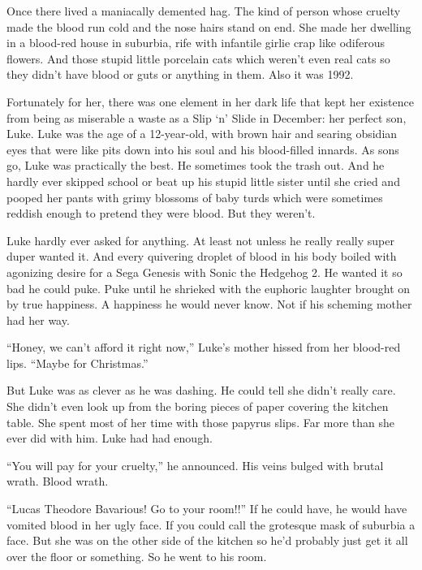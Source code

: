

Once there lived a maniacally demented hag. The kind of person
whose cruelty made the blood run cold and the nose hairs stand on
end. She made her dwelling in a blood-red house in suburbia, rife
with infantile girlie crap like odiferous flowers. And those stupid
little porcelain cats which weren't even real cats so they
didn't have blood or guts or anything in them. Also it was
1992.



Fortunately for her, there was one element in her dark life that
kept her existence from being as miserable a waste as a Slip
`n' Slide in December: her perfect son, Luke. Luke was
the age of a 12-year-old, with brown hair and searing obsidian eyes
that were like pits down into his soul and his blood-filled
innards. As sons go, Luke was practically the best. He sometimes
took the trash out. And he hardly ever skipped school or beat up
his stupid little sister until she cried and pooped her pants with
grimy blossoms of baby turds which were sometimes reddish enough to
pretend they were blood. But they weren't.



Luke hardly ever asked for anything. At least not unless he really
really super duper wanted it. And every quivering droplet of blood
in his body boiled with agonizing desire for a Sega Genesis with
Sonic the Hedgehog 2. He wanted it so bad he could puke. Puke until
he shrieked with the euphoric laughter brought on by true
happiness. A happiness he would never know. Not if his scheming
mother had her way.



``Honey, we can't afford it right now,''
Luke's mother hissed from her blood-red lips. ``Maybe
for Christmas.''



But Luke was as clever as he was dashing. He could tell she
didn't really care. She didn't even look up from the
boring pieces of paper covering the kitchen table. She spent most
of her time with those papyrus slips. Far more than she ever did
with him. Luke had had enough.



``You will pay for your cruelty,'' he announced. His
veins bulged with brutal wrath. Blood wrath.



``Lucas Theodore Bavarious! Go to your room!!'' If he
could have, he would have vomited blood in her ugly face. If you
could call the grotesque mask of suburbia a face. But she was on
the other side of the kitchen so he'd probably just get it
all over the floor or something. So he went to his room.



